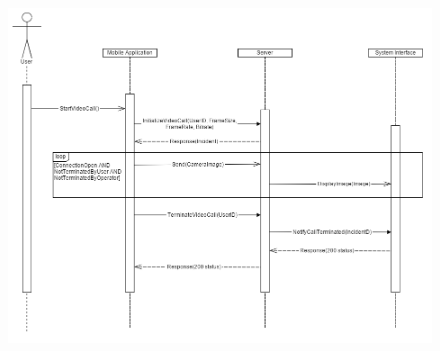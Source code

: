 \documentclass{article}
\begin{document}
	
	\begin{figure}[h]
		\centering
		\includegraphics[width=.9\textwidth]{"VideoStream/3"}

		
	\end{figure} \clearpage
	
	
	
\end{document}
